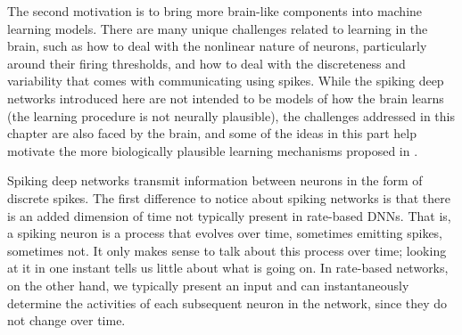 The second motivation is to bring more brain-like components
into machine learning models.
There are many unique challenges related to learning in the brain,
such as how to deal with the nonlinear nature of neurons,
particularly around their firing thresholds,
and how to deal with the discreteness and variability that comes with
communicating using spikes.
While the spiking deep networks introduced here
are not intended to be models of how the brain learns
(the learning procedure is not neurally plausible),
the challenges addressed in this chapter are also faced by the brain,
and some of the ideas in this part help motivate
the more biologically plausible learning mechanisms proposed
in .


Spiking deep networks transmit information between neurons
in the form of discrete spikes.
The first difference to notice about spiking networks is that there
is an added dimension of time not typically present in rate-based DNNs.
That is, a spiking neuron is a process that evolves over time,
sometimes emitting spikes, sometimes not.
It only makes sense to talk about this process over time;
looking at it in one instant tells us little about what is going on.
In rate-based networks, on the other hand,
we typically present an input and can instantaneously determine the activities
of each subsequent neuron in the network,
since they do not change over time.

